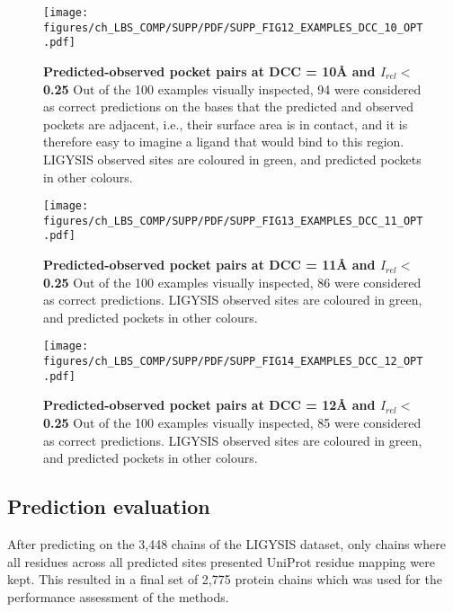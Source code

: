 \begin{figure}[ht!]
    \centering
    \texttt{[image: figures/ch\_LBS\_COMP/SUPP/PDF/SUPP\_FIG12\_EXAMPLES\_DCC\_10\_OPT.pdf]}
    \caption[Predicted-observed pocket pairs at DCC = 10\AA{} and $I_{rel} <$ 0.25]{\textbf{Predicted-observed pocket pairs at DCC = 10\AA{} and $I_{rel} <$ 0.25} Out of the 100 examples visually inspected, 94 were considered as correct predictions on the bases that the predicted and observed pockets are adjacent, i.e., their surface area is in contact, and it is therefore easy to imagine a ligand that would bind to this region. LIGYSIS observed sites are coloured in green, and predicted pockets in other colours.}
    \label{fig:DCC_10_examples}
\end{figure}
\FloatBarrier

\begin{figure}[ht!]
    \centering
    \texttt{[image: figures/ch\_LBS\_COMP/SUPP/PDF/SUPP\_FIG13\_EXAMPLES\_DCC\_11\_OPT.pdf]}
    \caption[Predicted-observed pocket pairs at DCC = 11\AA{} and $I_{rel} <$ 0.25]{\textbf{Predicted-observed pocket pairs at DCC = 11\AA{} and $I_{rel} <$ 0.25} Out of the 100 examples visually inspected, 86 were considered as correct predictions. LIGYSIS observed sites are coloured in green, and predicted pockets in other colours.}
    \label{fig:DCC_11_examples}
\end{figure}
\FloatBarrier

\begin{figure}[ht!]
    \centering
    \texttt{[image: figures/ch\_LBS\_COMP/SUPP/PDF/SUPP\_FIG14\_EXAMPLES\_DCC\_12\_OPT.pdf]}
    \caption[Predicted-observed pocket pairs at DCC = 12\AA{} and $I_{rel} <$ 0.25]{\textbf{Predicted-observed pocket pairs at DCC = 12\AA{} and $I_{rel} <$ 0.25} Out of the 100 examples visually inspected, 85 were considered as correct predictions. LIGYSIS observed sites are coloured in green, and predicted pockets in other colours.}
    \label{fig:DCC_12_examples}
\end{figure}
\FloatBarrier

\subsection{Prediction evaluation}

After predicting on the 3,448 chains of the LIGYSIS dataset, only chains where all residues across all predicted sites presented UniProt residue mapping were kept. This resulted in a final set of 2,775 protein chains which was used for the performance assessment of the methods.

